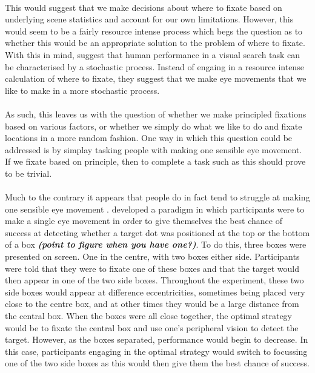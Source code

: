 \documentclass[12pt]{article}
\begin{document}
\paragraph{} This would suggest that we make decisions about where to fixate based on underlying scene statistics and account for our own limitations. However, this would seem to be a fairly resource intense process which begs the question as to whether this would be an appropriate solution to the problem of where to fixate. With this in mind, \cite{clarke2016stocha} suggest that human performance in a visual search task can be characterised by a stochastic process. Instead of engaing in a resource intense calculation of where to fixate, they suggest that we make eye movements that we like to make in a more stochastic process. 

\paragraph{} As such, this leaves us with the question of whether we make principled fixations based on various factors, or whether we simply do what we like to do and fixate locations in a more random fashion. One way in which this question could be addressed is by simplay tasking people with making one sensible eye movement. If we fixate based on principle, then to complete a task such as this should prove to be trivial. 

\paragraph{} Much to the contrary it appears that people do in fact tend to struggle at making one sensible eye movement \citep{morvan2012human,clarke2015failure}. \cite{morvan2012human} developed a paradigm in which participants were to make a single eye movement in order to give themselves the best chance of success at detecting whether a target dot was positioned at the top or the bottom of a box \textbf{\textit{(point to figure when you have one?)}}. To do this, three boxes were presented on screen. One in the centre, with two boxes either side. Participants were told that they were to fixate one of these boxes and that the target would then appear in one of the two side boxes. Throughout the experiment, these two side boxes would appear at difference eccentricities, sometimes being placed very close to the centre box, and at other times they would be a large distance from the central box. When the boxes were all close together, the optimal strategy would be to fixate the central box and use one's peripheral vision to detect the target. However, as the boxes separated, performance would begin to decrease. In this case, participants engaging in the optimal strategy would switch to focussing one of the two side boxes as this would then give them the best chance of success. 
\end{document}
